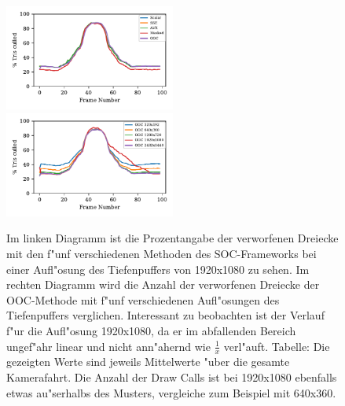 \documentclass[journal]{vgtc}
\begin{document}
\begin{figure}
	\begin{minipage}{\textwidth}
		\includegraphics[width=0.5\textwidth]{images/Evaluation_1_Results_Percentage culled.pdf}
		\includegraphics[width=0.5\textwidth]{images/Evaluation_4_Results_Percentage culled.pdf}
	\end{minipage}
	\begin{minipage}{\textwidth}
		\centering
	\end{minipage}
	\caption{Im linken Diagramm ist die Prozentangabe der verworfenen Dreiecke mit den f"unf verschiedenen Methoden des SOC-Frameworks bei einer Aufl"osung des Tiefenpuffers von 1920x1080 zu sehen. Im rechten Diagramm wird die Anzahl der verworfenen Dreiecke der OOC-Methode mit f"unf verschiedenen Aufl"osungen des Tiefenpuffers verglichen. Interessant zu beobachten ist der Verlauf f"ur die Aufl"osung 1920x1080, da er im abfallenden Bereich ungef"ahr linear und nicht ann"ahernd wie $\frac{1}{x}$ verl"auft. Tabelle: Die gezeigten Werte sind jeweils Mittelwerte "uber die gesamte Kamerafahrt. Die Anzahl der Draw Calls ist bei 1920x1080 ebenfalls etwas au"serhalbs des Musters, vergleiche zum Beispiel mit 640x360.}
	\label{fig:resolution_culled}
\end{figure}
\end{document}
